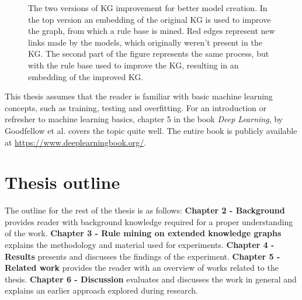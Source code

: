 \begin{figure}[htp]
    \centering
    
    \caption[Figure representing the process.]{The two versions of KG improvement for better model creation. In the top version an embedding of the original KG is used to improve the graph, from which a rule base is mined. Red edges represent new links made by the models, which originally weren't present in the KG. The second part of the figure represents the same process, but with the rule base used to improve the KG, resulting in an embedding of the improved KG. }
    \label{rule_based_and_embedding}
\end{figure}

This thesis assumes that the reader is familiar with basic machine learning concepts, such as training, testing and overfitting. For an introduction or refresher to machine learning basics, chapter 5 in the book \textit{Deep Learning}, by Goodfellow et al. \cite{goodfellow} covers the topic quite well. The entire book is publicly available at \href{https://www.deeplearningbook.org/}{https://www.deeplearningbook.org/}.


\section{Thesis outline}
The outline for the rest of the thesis is as follows: \newline \newline \newline
\textbf{Chapter 2 - Background} provides reader with background knowledge required for a proper understanding of the work. \newline
\newline
\textbf{Chapter 3 - Rule mining on extended knowledge graphs} explains the methodology and material used for experiments. \newline
\newline
\textbf{Chapter 4 - Results} presents and discusses the findings of the experiment. \newline \newline
\textbf{Chapter 5 - Related work} provides the reader with an overview of works related to the thesis. \newline \newline
\textbf{Chapter 6 - Discussion} evaluates and discusses the work in general and explains an earlier approach explored during research.